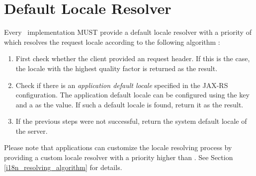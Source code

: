 \section{Default Locale Resolver}
\label{i18n_default_resolver}

Every \mvc\ implementation MUST provide a default locale resolver with a priority of 
which resolves the request locale according to the following algorithm 
:

\begin{enumerate}
\item First check whether the client provided an  request header.
 If this is the case, the locale with the highest quality factor is returned as
 the result. 
\item Check if there is an {\em application default locale} specified in the JAX-RS 
 configuration. The application default locale can be configured using the key 
  and a  as the value. 
 If such a default locale is found, return it as the result.
\item If the previous steps were not successful, return the system default locale of the 
 server.
\end{enumerate}

Please note that applications can customize the locale resolving process by providing
a custom locale resolver with a priority higher than .
See Section \ref{i18n_resolving_algorithm} for details.
